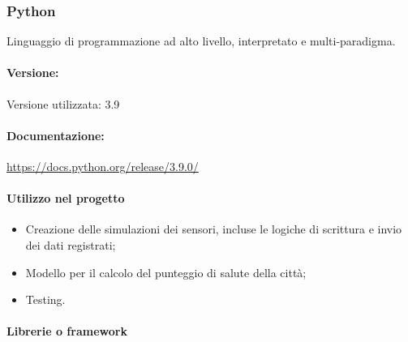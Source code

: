 \subsubsection{Python}
Linguaggio di programmazione ad alto livello, interpretato e multi-paradigma.

\paragraph{Versione:}
Versione utilizzata: 3.9
\paragraph{Documentazione:}
\url{https://docs.python.org/release/3.9.0/}

\paragraph{Utilizzo nel progetto} 
\begin{itemize}
    \item Creazione delle simulazioni dei sensori, incluse le logiche di scrittura e invio dei dati registrati;
    \item Modello per il calcolo del punteggio di salute della città;
    \item Testing.
\end{itemize}

\paragraph{Librerie o framework}

